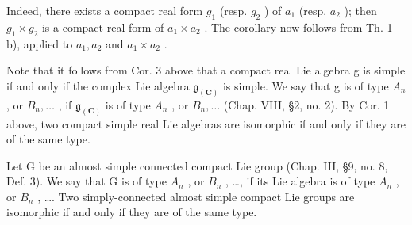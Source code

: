 Indeed, there exists a compact real form \(g_{1}\) (resp. \(g_{2}\) ) of \(a_{1}\) (resp. \(a_{2}\) ); then \(g_{1} \times g_{2}\) is a compact real form of \(a_{1} \times a_{2}\) . The corollary now follows from Th. 1 b), applied to \(a_{1}, a_{2}\) and \(a_{1} \times a_{2}\) .

Note that it follows from Cor. 3 above that a compact real Lie algebra g is simple if and only if the complex Lie algebra \(\mathfrak{g}_{(\mathbf{C})}\) is simple. We say that g is of type \(A_{n}\) , or \(B_{n}, \ldots\) , if \(\mathfrak{g}_{(\mathbf{C})}\) is of type \(A_{n}\) , or \(B_{n}, \ldots\) (Chap. VIII, §2, no. 2). By Cor. 1 above, two compact simple real Lie algebras are isomorphic if and only if they are of the same type.

Let G be an almost simple connected compact Lie group (Chap. III, §9, no. 8, Def. 3). We say that G is of type \(A_{n}\) , or \(B_{n}\) , \ldots, if its Lie algebra is of type \(A_{n}\) , or \(B_{n}\) , \ldots. Two simply-connected almost simple compact Lie groups are isomorphic if and only if they are of the same type.

